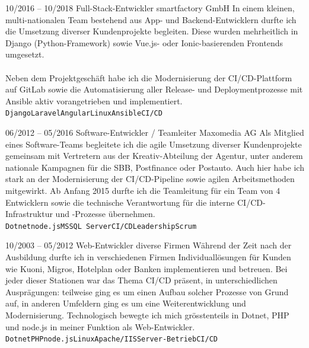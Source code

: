 \documentclass[10pt]{../developercv} %
\begin{document}
\begin{entrylist}
	\entry
	{\footnotesize 10/2016 -- 10/2018}
	{Full-Stack-Entwickler}
	{smartfactory GmbH}
	{In einem kleinen, multi-nationalen Team bestehend aus App- und Backend-Entwicklern durfte ich die Umsetzung diverser Kundenprojekte begleiten. Diese wurden mehrheitlich in Django (Python-Framework) sowie Vue.js- oder Ionic-basierenden Frontends umgesetzt.\\ \\ Neben dem Projektgeschäft habe ich die Modernisierung der CI/CD-Plattform auf GitLab sowie die Automatisierung aller Release- und Deploymentprozesse mit Ansible aktiv vorangetrieben und implementiert.\\ \small \texttt{Django}\slashsep\texttt{Laravel}\slashsep\texttt{Angular}\slashsep\texttt{Linux}\slashsep\texttt{Ansible}\slashsep\texttt{CI/CD}}

	\entry
	{\footnotesize 06/2012 -- 05/2016}
	{Software-Entwickler / Teamleiter}
	{Maxomedia AG}
	{Als Mitglied eines Software-Teams begleitete ich die agile Umsetzung diverser Kundenprojekte gemeinsam mit Vertretern aus der Kreativ-Abteilung der Agentur, unter anderem nationale Kampagnen für die SBB, Postfinance oder Postauto. Auch hier habe ich stark an der Modernisierung der CI/CD-Pipeline sowie agilen Arbeitsmethoden mitgewirkt. Ab Anfang 2015 durfte ich die Teamleitung für ein Team von 4 Entwicklern sowie die technische Verantwortung für die interne CI/CD-Infrastruktur und -Prozesse übernehmen.\\ \small \texttt{Dotnet}\slashsep\texttt{node.js}\slashsep\texttt{MSSQL Server}\slashsep\texttt{CI/CD}\slashsep\texttt{Leadership}\slashsep\texttt{Scrum}}

	\entry
	{\footnotesize 10/2003 -- 05/2012}
	{Web-Entwickler}
	{diverse Firmen}
	{Während der Zeit nach der Ausbildung durfte ich in verschiedenen Firmen Individuallösungen für Kunden wie Kuoni, Migros, Hotelplan oder Banken implementieren und betreuen. Bei jeder dieser Stationen war das Thema CI/CD präsent, in unterschiedlichen Ausprägungen: teilweise ging es um einen Aufbau solcher Prozesse von Grund auf, in anderen Umfeldern ging es um eine Weiterentwicklung und Modernisierung. Technologisch bewegte ich mich grösstenteils in Dotnet, PHP und node.js in meiner Funktion als Web-Entwickler.\\ \small \texttt{Dotnet}\slashsep\texttt{PHP}\slashsep\texttt{node.js}\slashsep\texttt{Linux}\slashsep\texttt{Apache/IIS}\slashsep\texttt{Server-Betrieb}\slashsep\texttt{CI/CD}}

\end{entrylist}
\end{document}
